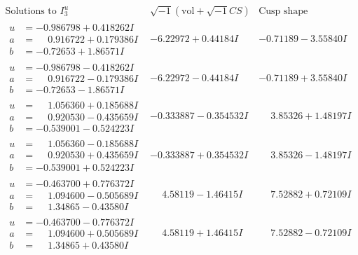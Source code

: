 \documentclass[1p]{elsarticle_modified}
\theoremstyle{definition}
\newcommand{\I}{\sqrt{-1}}
\begin{document}
$$\begin{array}{c|c|c}  
\text{Solutions to }I^u_{3}& \I (\text{vol} + \sqrt{-1}CS) & \text{Cusp shape}\\
 \hline 
\begin{aligned}
u &= -0.986798 + 0.418262 I \\
a &= \phantom{-}0.916722 + 0.179386 I \\
b &= -0.72653 + 1.86571 I\end{aligned}
 & -6.22972 + 0.44184 I & -0.71189 - 3.55840 I \\ \hline\begin{aligned}
u &= -0.986798 - 0.418262 I \\
a &= \phantom{-}0.916722 - 0.179386 I \\
b &= -0.72653 - 1.86571 I\end{aligned}
 & -6.22972 - 0.44184 I & -0.71189 + 3.55840 I \\ \hline\begin{aligned}
u &= \phantom{-}1.056360 + 0.185688 I \\
a &= \phantom{-}0.920530 - 0.435659 I \\
b &= -0.539001 - 0.524223 I\end{aligned}
 & -0.333887 - 0.354532 I & \phantom{-}3.85326 + 1.48197 I \\ \hline\begin{aligned}
u &= \phantom{-}1.056360 - 0.185688 I \\
a &= \phantom{-}0.920530 + 0.435659 I \\
b &= -0.539001 + 0.524223 I\end{aligned}
 & -0.333887 + 0.354532 I & \phantom{-}3.85326 - 1.48197 I \\ \hline\begin{aligned}
u &= -0.463700 + 0.776372 I \\
a &= \phantom{-}1.094600 - 0.505689 I \\
b &= \phantom{-}1.34865 - 0.43580 I\end{aligned}
 & \phantom{-}4.58119 - 1.46415 I & \phantom{-}7.52882 + 0.72109 I \\ \hline\begin{aligned}
u &= -0.463700 - 0.776372 I \\
a &= \phantom{-}1.094600 + 0.505689 I \\
b &= \phantom{-}1.34865 + 0.43580 I\end{aligned}
 & \phantom{-}4.58119 + 1.46415 I & \phantom{-}7.52882 - 0.72109 I \\ \hline\begin{aligned}

\end{aligned}
\end{array}$$
\end{document}
